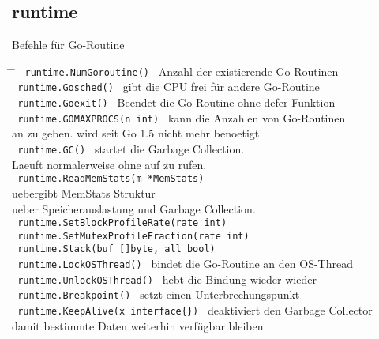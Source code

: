 \documentclass[twoside,a4paper,12pt]{article}
\begin{document}
\subsection{runtime}
Befehle für Go-Routine \label{sec:runtime}
\begin{tabbing}
 \hspace{2mm} \= \hspace{70mm} \= \kill
 \> \verb| runtime.NumGoroutine() | \> Anzahl der existierende Go-Routinen \\ 
 \> \verb| runtime.Gosched() | \> gibt die CPU frei für andere Go-Routine \\ 
 \> \verb| runtime.Goexit() | \> Beendet die Go-Routine ohne defer-Funktion \\ 
 \> \verb| runtime.GOMAXPROCS(n int) | \> kann die Anzahlen von Go-Routinen \\
 \> \> an zu geben. wird seit Go 1.5 nicht mehr benoetigt\\ 
 \> \verb| runtime.GC() | \> startet die Garbage Collection. \\ 
 \> \> Laeuft normalerweise ohne auf zu rufen. \\ 
 \> \verb| runtime.ReadMemStats(m *MemStats) | \\ 
 \> \> uebergibt MemStats Struktur \\ 
 \> \> ueber Speicherauslastung und Garbage Collection. \\ 
 \> \verb| runtime.SetBlockProfileRate(rate int) | \\ 
 \> \verb| runtime.SetMutexProfileFraction(rate int) | \\ 
 \> \verb| runtime.Stack(buf []byte, all bool) | \\ 
 \> \verb| runtime.LockOSThread() | \> bindet die Go-Routine an den OS-Thread \\
 \> \verb| runtime.UnlockOSThread() | \> hebt die Bindung wieder wieder \\ 
 \> \verb| runtime.Breakpoint() | \> setzt einen Unterbrechungspunkt \\ 
 \> \verb| runtime.KeepAlive(x interface{}) | \> deaktiviert den Garbage Collector \\ 
 \> \> damit bestimmte Daten weiterhin verfügbar bleiben \\
\end{tabbing}
\end{document}
